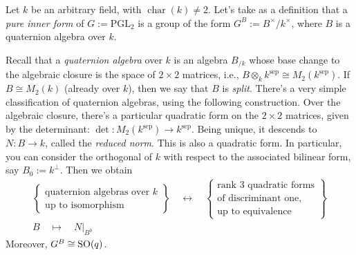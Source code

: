 \documentclass[reqno]{amsart} 
\numberwithin{theorem}{section}
\numberwithin{equation}{section}
\numberwithin{exercise}{section}
\begin{document}
Let $k$ be an arbitrary field, with $\operatorname{char}(k) \neq 2$.  Let's take as a definition that a \emph{pure inner form} of $G := \mathrm{PGL}_2$ is a group of the form $G^B := B^\times / k^\times$, where $B$ is a quaternion algebra over $k$.

Recall that a \emph{quaternion algebra} over $k$ is an algebra $B_{/k}$ whose base change to the algebraic closure is the space of $2 \times 2$ matrices, i.e., $B \otimes_k k^{\mathrm{sep}} \cong M_2(k^{\mathrm{sep}})$.  If $B \cong M_2(k)$ (already over $k$), then we say that $B$ is \emph{split}.  There's a very simple classification of quaternion algebras, using the following construction.  Over the algebraic closure, there's a particular quadratic form on the $2 \times 2$ matrices, given by the determinant: $\det : M_2(k^{\mathrm{sep}}) \rightarrow k^{\mathrm{sep}}$.  Being unique, it descends to $N : B \rightarrow k$, called the \emph{reduced norm}.  This is also a quadratic form.  In particular, you can consider the orthogonal of $k$ with respect to the associated bilinear form, say $B_0 := k^\perp$.  Then we obtain
\begin{gather*}
  \left\{
    \begin{array}{c}
      \text{quaternion algebras over } k \\
      \text{up to isomorphism}
    \end{array}
  \right\}
  \quad \longleftrightarrow \quad
  \left\{
    \begin{array}{c}
      \text{rank } 3 \text{ quadratic forms} \\
      \text{of discriminant one,} \\
      \text{up to equivalence}
    \end{array}
  \right\} \\[1em]
  B \quad \longmapsto \quad N|_{B^0}
\end{gather*}
Moreover, $G^B \cong \operatorname{SO}(q)$.
\end{document}
